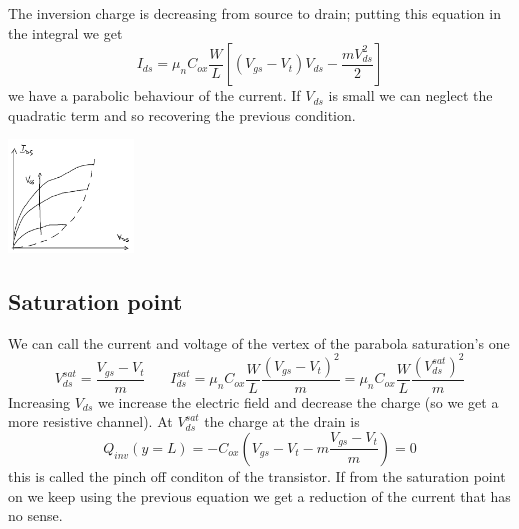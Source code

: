 \vspace{3mm}
\centering
{}
\raggedright
\vspace{3mm}


The inversion charge is decreasing from source to drain; putting this equation in the integral we get 
\begin{equation}
I_{ds}=\mu_nC_{ox}\frac{W}{L}[(V_{gs}-V_t)V_{ds}-\frac{mV_{ds}^2}{2}]
\end{equation}
we have a parabolic behaviour of the current. If $V_{ds}$ is small we can neglect the quadratic term and so recovering the previous condition.


\centering
\includegraphics[width=0.25\textwidth]{parabreg.png}\\
\raggedright


\vspace{3mm}
\centering
{}
\raggedright
\vspace{3mm}


\subsection{Saturation point}
We can call the current and voltage of the vertex of the parabola saturation's one 
\begin{equation}
V_{ds}^{sat}=\frac{V_{gs}-V_t}{m}\ \ \ \ \ \ \ \ I_{ds}^{sat}=\mu_nC_{ox}\frac{W}{L}\frac{(V_{gs}-V_t)^2}{m}=\mu_nC_{ox}\frac{W}{L}\frac{(V_{ds}^{sat})^2}{m}
\end{equation}
Increasing $V_{ds}$ we increase the electric field and decrease the charge (so we get a more resistive channel). At $V_{ds}^{sat}$ the charge at the drain is 
\begin{equation}
Q_{inv}(y=L)=-C_{ox}(V_{gs}-V_t-m \frac{V_{gs}-V_t}{m})=0
\end{equation}
this is called the pinch off conditon of the transistor. If from the saturation point on we keep using the previous equation we get a reduction of the current that has no sense.\\

